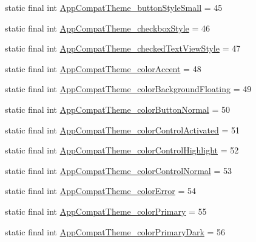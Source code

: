 \begin{DoxyCompactItemize}
\item 
static final int \mbox{\hyperlink{classandroid_1_1support_1_1v7_1_1appcompat_1_1_r_1_1styleable_a70ffb6778fe591be92a4e977041ceb1b}{App\+Compat\+Theme\+\_\+button\+Style\+Small}} = 45
\item 
static final int \mbox{\hyperlink{classandroid_1_1support_1_1v7_1_1appcompat_1_1_r_1_1styleable_ada4b0b595cec8ec5a840ac248c86755e}{App\+Compat\+Theme\+\_\+checkbox\+Style}} = 46
\item 
static final int \mbox{\hyperlink{classandroid_1_1support_1_1v7_1_1appcompat_1_1_r_1_1styleable_ab350011c7d2324d433bb85860f934f39}{App\+Compat\+Theme\+\_\+checked\+Text\+View\+Style}} = 47
\item 
static final int \mbox{\hyperlink{classandroid_1_1support_1_1v7_1_1appcompat_1_1_r_1_1styleable_a0cd7e26f664fcb4b1b0a43233a91081a}{App\+Compat\+Theme\+\_\+color\+Accent}} = 48
\item 
static final int \mbox{\hyperlink{classandroid_1_1support_1_1v7_1_1appcompat_1_1_r_1_1styleable_a8d08cfe8d4c9faf074f5234cd092cf03}{App\+Compat\+Theme\+\_\+color\+Background\+Floating}} = 49
\item 
static final int \mbox{\hyperlink{classandroid_1_1support_1_1v7_1_1appcompat_1_1_r_1_1styleable_a51f631549bca57671c531469731bb198}{App\+Compat\+Theme\+\_\+color\+Button\+Normal}} = 50
\item 
static final int \mbox{\hyperlink{classandroid_1_1support_1_1v7_1_1appcompat_1_1_r_1_1styleable_a28584cdf55e54e1e8c7a1ac93734da0a}{App\+Compat\+Theme\+\_\+color\+Control\+Activated}} = 51
\item 
static final int \mbox{\hyperlink{classandroid_1_1support_1_1v7_1_1appcompat_1_1_r_1_1styleable_a353fb429ce2fe154c7531e98d327eb5c}{App\+Compat\+Theme\+\_\+color\+Control\+Highlight}} = 52
\item 
static final int \mbox{\hyperlink{classandroid_1_1support_1_1v7_1_1appcompat_1_1_r_1_1styleable_a4bc4872d61206618aeabe28880c6402f}{App\+Compat\+Theme\+\_\+color\+Control\+Normal}} = 53
\item 
static final int \mbox{\hyperlink{classandroid_1_1support_1_1v7_1_1appcompat_1_1_r_1_1styleable_afac8120025ab1795760b42e662f83c60}{App\+Compat\+Theme\+\_\+color\+Error}} = 54
\item 
static final int \mbox{\hyperlink{classandroid_1_1support_1_1v7_1_1appcompat_1_1_r_1_1styleable_a08b3d2406679170d65c83db4b08211e6}{App\+Compat\+Theme\+\_\+color\+Primary}} = 55
\item 
static final int \mbox{\hyperlink{classandroid_1_1support_1_1v7_1_1appcompat_1_1_r_1_1styleable_af2ef6915870572b1e457d6961dce8f9a}{App\+Compat\+Theme\+\_\+color\+Primary\+Dark}} = 56

\end{DoxyCompactItemize}
